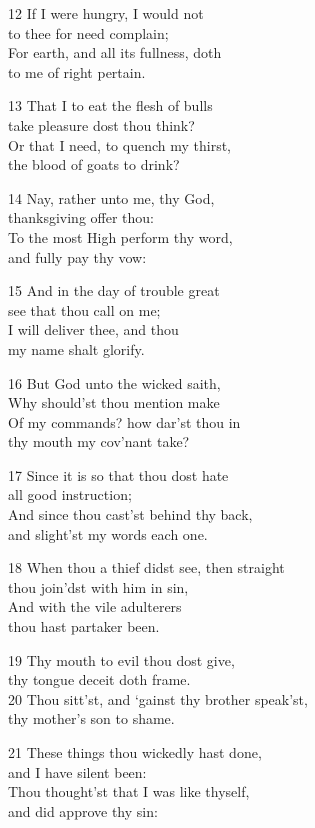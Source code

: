 \begin{multicols}{3}
12 If I were hungry, I would not\\
to thee for need complain;\\
For earth, and all its fullness, doth\\
to me of right pertain.

13 That I to eat the flesh of bulls\\
take pleasure dost thou think?\\
Or that I need, to quench my thirst,\\
the blood of goats to drink?

14 Nay, rather unto me, thy God,\\
thanksgiving offer thou:\\
To the most High perform thy word,\\
and fully pay thy vow:

15 And in the day of trouble great\\
see that thou call on me;\\
I will deliver thee, and thou\\
my name shalt glorify.

16 But God unto the wicked saith,\\
Why should’st thou mention make\\
Of my commands? how dar’st thou in\\
thy mouth my cov’nant take?

17 Since it is so that thou dost hate\\
all good instruction;\\
And since thou cast’st behind thy back,\\
and slight’st my words each one.

18 When thou a thief didst see, then straight\\
thou join’dst with him in sin,\\
And with the vile adulterers\\
thou hast partaker been.

19 Thy mouth to evil thou dost give,\\
thy tongue deceit doth frame.\\
20 Thou sitt’st, and ‘gainst thy brother speak’st,\\
thy mother’s son to shame.

21 These things thou wickedly hast done,\\
and I have silent been:\\
Thou thought’st that I was like thyself,\\
and did approve thy sin:


\end{multicols}
